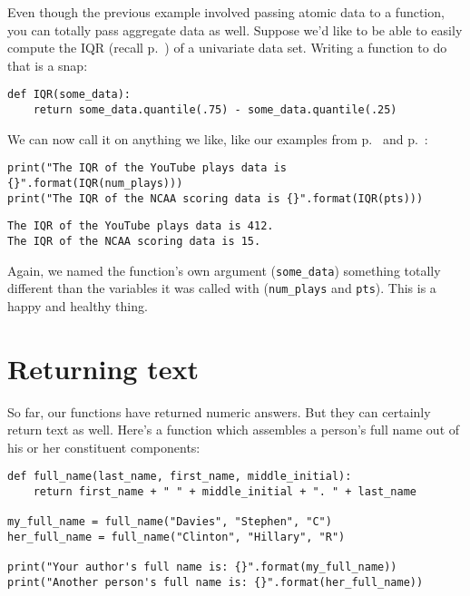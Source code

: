 
Even though the previous example involved passing atomic data to a function,
you can totally pass aggregate data as well. Suppose we'd like to be able to
easily compute the IQR (recall p.~\pageref{IQR}) of a univariate data set.
Writing a function to do that is a snap:

\begin{Verbatim}[fontsize=\small,samepage=true,frame=single,framesep=3mm]
def IQR(some_data):
    return some_data.quantile(.75) - some_data.quantile(.25)
\end{Verbatim}

We can now call it on anything we like, like our examples from
p.~\pageref{YouTubeData} and p.~\pageref{NCAAData}:

\begin{Verbatim}[fontsize=\small,samepage=true,frame=single,framesep=3mm]
print("The IQR of the YouTube plays data is {}".format(IQR(num_plays)))
print("The IQR of the NCAA scoring data is {}".format(IQR(pts)))
\end{Verbatim}
\vspace{-.2in}

\begin{Verbatim}[fontsize=\small,samepage=true,frame=leftline,framesep=5mm,framerule=1mm]
The IQR of the YouTube plays data is 412.
The IQR of the NCAA scoring data is 15.
\end{Verbatim}

Again, we named the function's own argument (\texttt{some\_data}) something
totally different than the variables it was called with (\texttt{num\_plays}
and \texttt{pts}). This is a happy and healthy thing.

\section{Returning text}

So far, our functions have returned numeric answers. But they can certainly
return text as well. Here's a function which assembles a person's full name out
of his or her constituent components:

\begin{Verbatim}[fontsize=\small,samepage=true,frame=single,framesep=3mm]
def full_name(last_name, first_name, middle_initial):
    return first_name + " " + middle_initial + ". " + last_name

my_full_name = full_name("Davies", "Stephen", "C")
her_full_name = full_name("Clinton", "Hillary", "R")

print("Your author's full name is: {}".format(my_full_name))
print("Another person's full name is: {}".format(her_full_name))
\end{Verbatim}
\vspace{-.2in}

